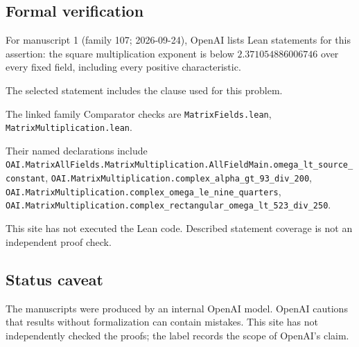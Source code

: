 \documentclass[11pt]{article}
\begin{document}
\subsection{Formal verification}
For manuscript 1 (family 107; 2026-09-24), OpenAI lists Lean statements for this assertion: the square multiplication exponent is below $2.371054886006746$ over every fixed field, including every positive characteristic.

The selected statement includes the clause used for this problem.

The linked family Comparator checks are \texttt{MatrixFields.lean}, \texttt{MatrixMultiplication.lean}.

Their named declarations include \texttt{OAI.MatrixAllFields.MatrixMultiplication.AllFieldMain.omega\_lt\_source\_constant}, \texttt{OAI.MatrixMultiplication.complex\_alpha\_gt\_93\_div\_200}, \texttt{OAI.MatrixMultiplication.complex\_omega\_le\_nine\_quarters}, \texttt{OAI.MatrixMultiplication.complex\_rectangular\_omega\_lt\_523\_div\_250}.

This site has not executed the Lean code. Described statement coverage is not an independent proof check.

\subsection{Status caveat}
The manuscripts were produced by an internal OpenAI model. OpenAI cautions that results without formalization can contain mistakes. This site has not independently checked the proofs; the label records the scope of OpenAI's claim.
\end{document}
